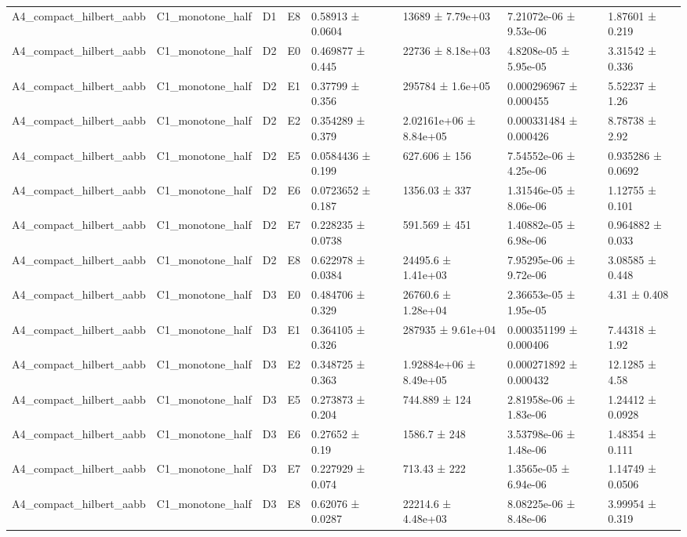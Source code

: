 \begin{table}
\begin{tabular}{lllllllll}
A4\_compact\_hilbert\_aabb & C1\_monotone\_half & D1 & E8 & 0.58913 ± 0.0604 &  & 13689 ± 7.79e+03 & 7.21072e-06 ± 9.53e-06 & 1.87601 ± 0.219 \\
A4\_compact\_hilbert\_aabb & C1\_monotone\_half & D2 & E0 & 0.469877 ± 0.445 &  & 22736 ± 8.18e+03 & 4.8208e-05 ± 5.95e-05 & 3.31542 ± 0.336 \\
A4\_compact\_hilbert\_aabb & C1\_monotone\_half & D2 & E1 & 0.37799 ± 0.356 &  & 295784 ± 1.6e+05 & 0.000296967 ± 0.000455 & 5.52237 ± 1.26 \\
A4\_compact\_hilbert\_aabb & C1\_monotone\_half & D2 & E2 & 0.354289 ± 0.379 &  & 2.02161e+06 ± 8.84e+05 & 0.000331484 ± 0.000426 & 8.78738 ± 2.92 \\
A4\_compact\_hilbert\_aabb & C1\_monotone\_half & D2 & E5 & 0.0584436 ± 0.199 &  & 627.606 ± 156 & 7.54552e-06 ± 4.25e-06 & 0.935286 ± 0.0692 \\
A4\_compact\_hilbert\_aabb & C1\_monotone\_half & D2 & E6 & 0.0723652 ± 0.187 &  & 1356.03 ± 337 & 1.31546e-05 ± 8.06e-06 & 1.12755 ± 0.101 \\
A4\_compact\_hilbert\_aabb & C1\_monotone\_half & D2 & E7 & 0.228235 ± 0.0738 &  & 591.569 ± 451 & 1.40882e-05 ± 6.98e-06 & 0.964882 ± 0.033 \\
A4\_compact\_hilbert\_aabb & C1\_monotone\_half & D2 & E8 & 0.622978 ± 0.0384 &  & 24495.6 ± 1.41e+03 & 7.95295e-06 ± 9.72e-06 & 3.08585 ± 0.448 \\
A4\_compact\_hilbert\_aabb & C1\_monotone\_half & D3 & E0 & 0.484706 ± 0.329 &  & 26760.6 ± 1.28e+04 & 2.36653e-05 ± 1.95e-05 & 4.31 ± 0.408 \\
A4\_compact\_hilbert\_aabb & C1\_monotone\_half & D3 & E1 & 0.364105 ± 0.326 &  & 287935 ± 9.61e+04 & 0.000351199 ± 0.000406 & 7.44318 ± 1.92 \\
A4\_compact\_hilbert\_aabb & C1\_monotone\_half & D3 & E2 & 0.348725 ± 0.363 &  & 1.92884e+06 ± 8.49e+05 & 0.000271892 ± 0.000432 & 12.1285 ± 4.58 \\
A4\_compact\_hilbert\_aabb & C1\_monotone\_half & D3 & E5 & 0.273873 ± 0.204 &  & 744.889 ± 124 & 2.81958e-06 ± 1.83e-06 & 1.24412 ± 0.0928 \\
A4\_compact\_hilbert\_aabb & C1\_monotone\_half & D3 & E6 & 0.27652 ± 0.19 &  & 1586.7 ± 248 & 3.53798e-06 ± 1.48e-06 & 1.48354 ± 0.111 \\
A4\_compact\_hilbert\_aabb & C1\_monotone\_half & D3 & E7 & 0.227929 ± 0.074 &  & 713.43 ± 222 & 1.3565e-05 ± 6.94e-06 & 1.14749 ± 0.0506 \\
A4\_compact\_hilbert\_aabb & C1\_monotone\_half & D3 & E8 & 0.62076 ± 0.0287 &  & 22214.6 ± 4.48e+03 & 8.08225e-06 ± 8.48e-06 & 3.99954 ± 0.319 \\

\end{tabular}
\end{table}
